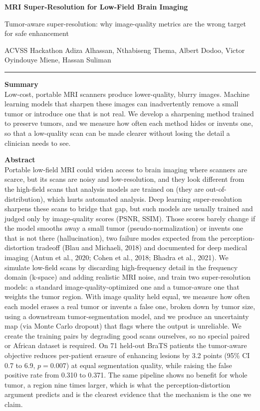 \documentclass[11pt,a4paper]{article}
\newcommand{\headfont}{\sffamily}
\newcommand{\thinrule}{\noindent\textcolor{rule}{\rule{\linewidth}{0.6pt}}}
\begin{document}
{\headfont\LARGE\bfseries MRI Super-Resolution for Low-Field Brain Imaging}

\vspace{0.15em}
{\headfont\normalsize\color{mid} Tumor-aware super-resolution: why image-quality metrics are the wrong target for safe enhancement}

\vspace{0.25em}
{\color{muted}\small ACVSS Hackathon \quad\textperiodcentered\quad Adiza Alhassan, Nthabiseng Thema, Albert Dodoo, Victor Oyindouye Miene, Hassan Suliman}

\vspace{0.4em}
\thinrule

{\headfont\normalsize\bfseries\color{ink} Summary}\\[0.15em]
Low-cost, portable MRI scanners produce lower-quality, blurry images. Machine learning models that sharpen these images can inadvertently remove a small tumor or introduce one that is not real. We develop a sharpening method trained to preserve tumors, and we measure how often each method hides or invents one, so that a low-quality scan can be made clearer without losing the detail a clinician needs to see.

\vspace{0.5em}
{\headfont\normalsize\bfseries\color{ink} Abstract}\\[0.15em]
Portable low-field MRI could widen access to brain imaging where scanners are scarce, but its scans are noisy and low-resolution, and they look different from the high-field scans that analysis models are trained on (they are out-of-distribution), which hurts automated analysis. Deep learning super-resolution sharpens these scans to bridge that gap, but such models are usually trained and judged only by image-quality scores (PSNR, SSIM). Those scores barely change if the model smooths away a small tumor (pseudo-normalization) or invents one that is not there (hallucination), two failure modes expected from the perception-distortion tradeoff (Blau and Michaeli, 2018) and documented for deep medical imaging (Antun et al., 2020; Cohen et al., 2018; Bhadra et al., 2021). We simulate low-field scans by discarding high-frequency detail in the frequency domain (k-space) and adding realistic MRI noise, and train two super-resolution models: a standard image-quality-optimized one and a tumor-aware one that weights the tumor region. With image quality held equal, we measure how often each model erases a real tumor or invents a false one, broken down by tumor size, using a downstream tumor-segmentation model, and we produce an uncertainty map (via Monte Carlo dropout) that flags where the output is unreliable. We create the training pairs by degrading good scans ourselves, so no special paired or African dataset is required. On 71 held-out BraTS patients the tumor-aware objective reduces per-patient erasure of enhancing lesions by 3.2 points (95\% CI 0.7 to 6.9, $p = 0.007$) at equal segmentation quality, while raising the false positive rate from 0.310 to 0.371. The same pipeline shows no benefit for whole tumor, a region nine times larger, which is what the perception-distortion argument predicts and is the clearest evidence that the mechanism is the one we claim.
\end{document}
